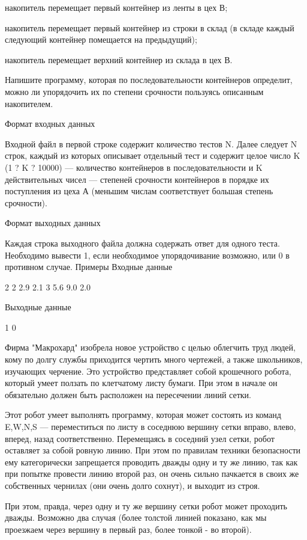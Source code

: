 \documentclass[]{article}
\begin{document}
\begin{enumerate}
накопитель перемещает первый контейнер из ленты в цех В;

накопитель перемещает первый контейнер из строки в склад (в складе каждый следующий контейнер помещается на предыдущий);

накопитель перемещает верхний контейнер из склада в цех В.

Напишите программу, которая по последовательности контейнеров определит, можно ли упорядочить их по степени срочности пользуясь описанным накопителем.

Формат входных данных

Входной файл в первой строке содержит количество тестов N. Далее следует N строк, каждый из которых описывает отдельный тест и содержит целое число K (1 ? K ? 10000) — количество контейнеров в последовательности и K действительных чисел — степеней срочности контейнеров в порядке их поступления из цеха А (меньшим числам соответствует большая степень срочности).

Формат выходных данных

Каждая строка выходного файла должна содержать ответ для одного теста. Необходимо вывести 1, если необходимое упорядочивание возможно, или 0 в противном случае.
Примеры
Входные данные

2
2 2.9 2.1
3 5.6 9.0 2.0

Выходные данные

1
0



Фирма "Макрохард" изобрела новое устройство с целью облегчить труд людей, кому по долгу службы приходится чертить много чертежей, а также школьников, изучающих черчение. Это устройство представляет собой крошечного робота, который умеет ползать по клетчатому листу бумаги. При этом в начале он обязательно должен быть расположен на пересечении линий сетки.

Этот робот умеет выполнять программу, которая может состоять из команд E,W,N,S — переместиться по листу в соседнюю вершину сетки вправо, влево, вперед, назад соответственно. Перемещаясь в соседний узел сетки, робот оставляет за собой ровную линию. При этом по правилам техники безопасности ему категорически запрещается проводить дважды одну и ту же линию, так как при попытке провести линию второй раз, он очень сильно пачкается в своих же собственных чернилах (они очень долго сохнут), и выходит из строя.

При этом, правда, через одну и ту же вершину сетки робот может проходить дважды. Возможно два случая (более толстой линией показано, как мы проезжаем через вершину в первый раз, более тонкой - во второй).


\end{enumerate}
\end{document}
